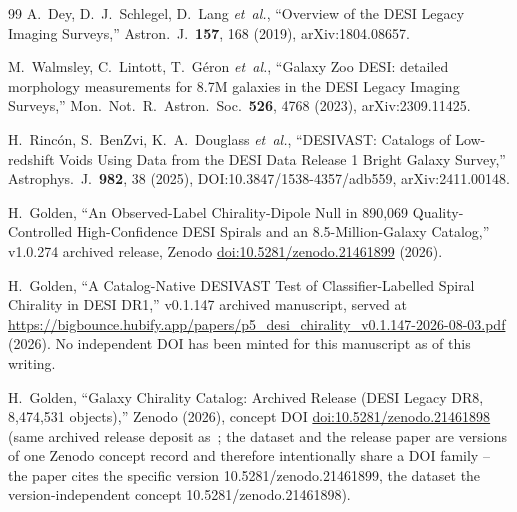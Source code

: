 \documentclass[twocolumn,linenumbers]{aastex702}
\begin{document}
\begin{thebibliography}{99}
A.~Dey, D.~J.~Schlegel, D.~Lang \textit{et~al.},
``Overview of the DESI Legacy Imaging Surveys,''
Astron.\ J.\ \textbf{157}, 168 (2019), arXiv:1804.08657.

M.~Walmsley, C.~Lintott, T.~G{\'e}ron \textit{et~al.},
``Galaxy Zoo DESI: detailed morphology measurements for 8.7M galaxies in the DESI Legacy Imaging Surveys,''
Mon.\ Not.\ R.\ Astron.\ Soc.\ \textbf{526}, 4768 (2023), arXiv:2309.11425.

H.~Rinc\'on, S.~BenZvi, K.~A.~Douglass \textit{et~al.},
``DESIVAST: Catalogs of Low-redshift Voids Using Data from the DESI Data
Release 1 Bright Galaxy Survey,'' Astrophys.\ J.\ \textbf{982}, 38 (2025),
DOI:10.3847/1538-4357/adb559, arXiv:2411.00148.

H.~Golden,
``An Observed-Label Chirality-Dipole Null in 890,069 Quality-Controlled High-Confidence DESI Spirals and an 8.5-Million-Galaxy Catalog,''
v1.0.274 archived release,
Zenodo \href{https://doi.org/10.5281/zenodo.21461899}{doi:10.5281/zenodo.21461899} (2026).

H.~Golden,
``A Catalog-Native DESIVAST Test of Classifier-Labelled Spiral Chirality in DESI DR1,''
v0.1.147 archived manuscript, served at
\url{https://bigbounce.hubify.app/papers/p5_desi_chirality_v0.1.147-2026-08-03.pdf}
(2026). No independent DOI has been minted for this manuscript as of this
writing.

H.~Golden,
``Galaxy Chirality Catalog: Archived Release (DESI Legacy DR8, 8,474,531 objects),''
Zenodo (2026), concept DOI
\href{https://doi.org/10.5281/zenodo.21461898}{doi:10.5281/zenodo.21461898}
(same archived release deposit as~\cite{Golden:P4v274}; the dataset and the
release paper are versions of one Zenodo concept record and therefore
intentionally share a DOI family -- the paper cites the specific version
10.5281/zenodo.21461899, the dataset the version-independent concept
10.5281/zenodo.21461898).

\end{thebibliography}
\end{document}
